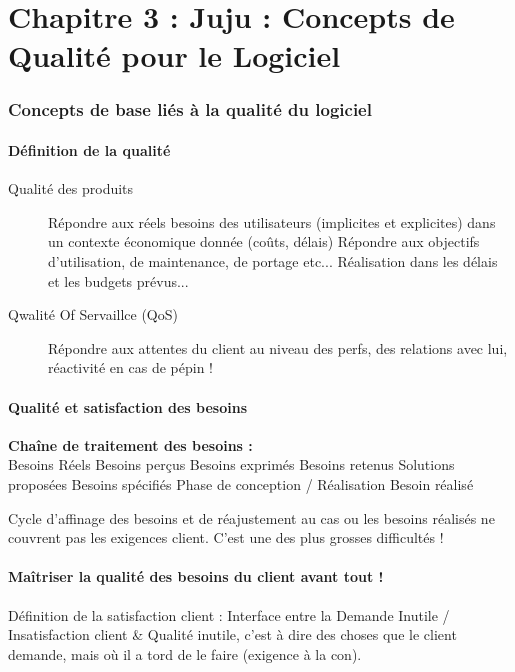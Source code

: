 ﻿\part{Chapitre 3 : Juju : Concepts de Qualité pour le Logiciel}

\section{Concepts de base liés à la qualité du logiciel}

	\subsection{Définition de la qualité}

	\begin{description}
    \item[Qualité des produits] Répondre aux réels besoins des utilisateurs (implicites et explicites) dans un contexte économique donnée (coûts, délais)
     Répondre aux objectifs d’utilisation, de maintenance, de portage etc... Réalisation dans les délais et les budgets prévus...
    \item[Qwalité Of Servaillce (QoS)] Répondre aux attentes du client au niveau des perfs, des relations avec lui, réactivité en cas de pépin !
	\end{description}


   \subsection{Qualité et satisfaction des besoins}

\textbf{Chaîne de traitement des besoins :}\hfill\\

Besoins Réels \rightarrow Besoins perçus \rightarrow Besoins exprimés \rightarrow Besoins retenus  \rightarrow  Solutions proposées \rightarrow Besoins spécifiés \rightarrow Phase de conception / Réalisation \rightarrow Besoin réalisé

Cycle d’affinage des besoins et de réajustement au cas ou les besoins réalisés ne couvrent pas les exigences client. C’est une des plus grosses difficultés !

   \subsection{Maîtriser la qualité des besoins du client avant tout !}

Définition de la satisfaction client : Interface entre la Demande Inutile / Insatisfaction client \& Qualité inutile, c’est à dire des choses que le client demande, mais où il a tord de le faire (exigence à la con).\\

